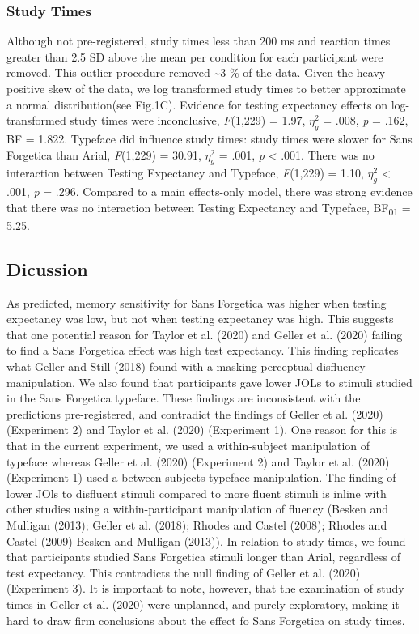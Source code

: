 \documentclass[
  english,
  jou]{apa6}
\begin{document}
\hypertarget{study-times}{%
\subsubsection{Study Times}\label{study-times}}

Although not pre-registered, study times less than 200 ms and reaction times greater than 2.5 SD above the mean per condition for each participant were removed. This outlier procedure removed \textasciitilde3 \% of the data. Given the heavy positive skew of the data, we log transformed study times to better approximate a normal distribution(see Fig.1C). Evidence for testing expectancy effects on log-transformed study times were inconclusive, \emph{F}(1,229) = 1.97, \(\eta_{g}^{2}\) = .008, \emph{p} = .162, BF = 1.822. Typeface did influence study times: study times were slower for Sans Forgetica than Arial, \emph{F}(1,229) = 30.91, \(\eta_{g}^{2}\) = .001, \emph{p} \textless{} .001. There was no interaction between Testing Expectancy and Typeface, \emph{F}(1,229) = 1.10, \(\eta_{g}^{2}\) \textless{} .001, \emph{p} = .296. Compared to a main effects-only model, there was strong evidence that there was no interaction between Testing Expectancy and Typeface, BF\textsubscript{01} = 5.25.

\hypertarget{dicussion}{%
\subsection{Dicussion}\label{dicussion}}

As predicted, memory sensitivity for Sans Forgetica was higher when testing expectancy was low, but not when testing expectancy was high. This suggests that one potential reason for Taylor et al. (2020) and Geller et al. (2020) failing to find a Sans Forgetica effect was high test expectancy. This finding replicates what Geller and Still (2018) found with a masking perceptual disfluency manipulation. We also found that participants gave lower JOLs to stimuli studied in the Sans Forgetica typeface. These findings are inconsistent with the predictions pre-registered, and contradict the findings of Geller et al. (2020) (Experiment 2) and Taylor et al. (2020) (Experiment 1). One reason for this is that in the current experiment, we used a within-subject manipulation of typeface whereas Geller et al. (2020) (Experiment 2) and Taylor et al. (2020) (Experiment 1) used a between-subjects typeface manipulation. The finding of lower JOls to disfluent stimuli compared to more fluent stimuli is inline with other studies using a within-participant manipulation of fluency (Besken and Mulligan (2013); Geller et al. (2018); Rhodes and Castel (2008); Rhodes and Castel (2009) Besken and Mulligan (2013)). In relation to study times, we found that participants studied Sans Forgetica stimuli longer than Arial, regardless of test expectancy. This contradicts the null finding of Geller et al. (2020) (Experiment 3). It is important to note, however, that the examination of study times in Geller et al. (2020) were unplanned, and purely exploratory, making it hard to draw firm conclusions about the effect fo Sans Forgetica on study times.
\end{document}
